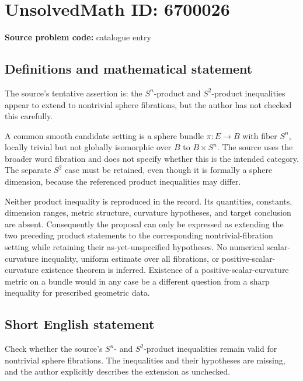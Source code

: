 \documentclass[11pt]{article}
\begin{document}
\section*{UnsolvedMath ID: 6700026}
\textbf{Source problem code:} catalogue entry
\subsection{Definitions and mathematical statement}
The source's tentative assertion is: the $S^n$-product and $S^2$-product inequalities appear to extend to nontrivial sphere fibrations, but the author has not checked this carefully.

A common smooth candidate setting is a sphere bundle $\pi:E\to B$ with fiber $S^n$, locally trivial but not globally isomorphic over $B$ to $B\times S^n$. The source uses the broader word fibration and does not specify whether this is the intended category. The separate $S^2$ case must be retained, even though it is formally a sphere dimension, because the referenced product inequalities may differ.

Neither product inequality is reproduced in the record. Its quantities, constants, dimension ranges, metric structure, curvature hypotheses, and target conclusion are absent. Consequently the proposal can only be expressed as extending the two preceding product statements to the corresponding nontrivial-fibration setting while retaining their as-yet-unspecified hypotheses. No numerical scalar-curvature inequality, uniform estimate over all fibrations, or positive-scalar-curvature existence theorem is inferred. Existence of a positive-scalar-curvature metric on a bundle would in any case be a different question from a sharp inequality for prescribed geometric data.
\subsection{Short English statement}
Check whether the source's $S^n$- and $S^2$-product inequalities remain valid for nontrivial sphere fibrations. The inequalities and their hypotheses are missing, and the author explicitly describes the extension as unchecked.
\end{document}
